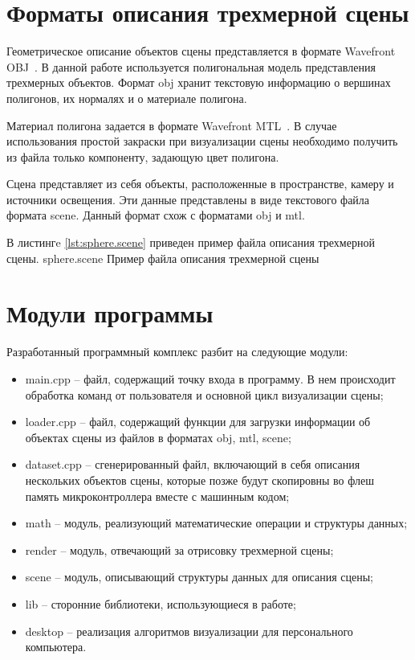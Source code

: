 \section{Форматы описания трехмерной сцены}
Геометрическое описание объектов сцены представляется в формате Wavefront OBJ~\cite{obj}. В данной работе используется полигональная модель представления трехмерных объектов. Формат obj хранит текстовую информацию о вершинах полигонов, их нормалях и о материале полигона. 

Материал полигона задается в формате Wavefront MTL~\cite{mtl}. В случае использования простой закраски при визуализации сцены необходимо получить из файла только компоненту, задающую цвет полигона. 

Сцена представляет из себя объекты, расположенные в пространстве, камеру и источники освещения. Эти данные представлены в виде текстового файла формата scene. Данный формат схож с форматами obj и mtl.

В листингe \ref{lst:sphere.scene} приведен пример файла описания трехмерной сцены.
    {sphere.scene}
    {Пример файла описания трехмерной сцены}

\section{Модули программы}
Разработанный программный комплекс разбит на следующие модули:
\begin{itemize}
    \item main.cpp -- файл, содержащий точку входа в программу. В нем происходит обработка команд от пользователя и основной цикл визуализации сцены;
    \item loader.cpp -- файл, содержащий функции для загрузки информации об объектах сцены из файлов в форматах obj, mtl, scene;
    \item dataset.cpp -- сгенерированный файл, включающий в себя описания нескольких объектов сцены, которые позже будут скопировны во флеш память микроконтроллера вместе с машинным кодом;
    \item math -- модуль, реализующий математические операции и структуры данных;
    \item render -- модуль, отвечающий за отрисовку трехмерной сцены;
    \item scene -- модуль, описывающий структуры данных для описания сцены;
    \item lib -- сторонние библиотеки, использующиеся в работе;
    \item desktop -- реализация алгоритмов визуализации для персонального компьютера.
\end{itemize}

